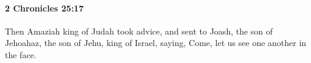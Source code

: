 
		\paragraph{2 Chronicles 25:17} %
			\label{2CHRONICLES-25-17}

			Then Amaziah king of Judah took advice, and sent to Joash, the son of Jehoahaz, the son of Jehu, king of Israel, saying, Come, let us see one another in the face.


